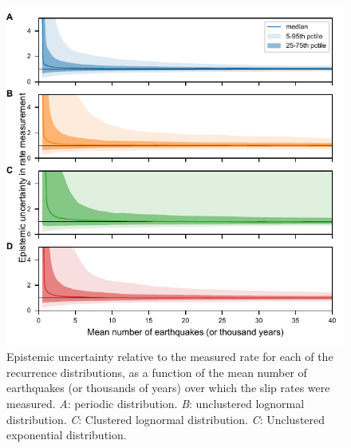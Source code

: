 \documentclass[se, manuscript]{copernicus}
\begin{document}
\begin{figure}[t]
  \includegraphics[width=12cm]{./figures/epist_unc.pdf}
  \caption{Epistemic uncertainty relative to the measured rate for each of the 
  recurrence distributions, as a function of the mean number of earthquakes (or 
  thousands of years) over which the slip rates were measured. \emph{A}: 
  periodic distribution. \emph{B}: unclustered lognormal distribution. 
  \emph{C}: Clustered lognormal distribution. \emph{C}: Unclustered exponential 
  distribution.
  \label{epist_unc}}
\end{figure}

\clearpage
\end{document}
